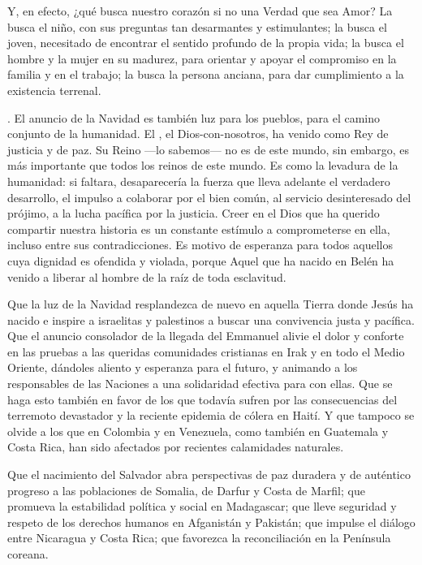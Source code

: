 Y, en efecto, ¿qué busca nuestro corazón si no una Verdad que sea Amor? La busca el niño, con sus preguntas tan desarmantes y estimulantes; la busca el joven, necesitado de encontrar el sentido profundo de la propia vida; la busca el hombre y la mujer en su madurez, para orientar y apoyar el compromiso en la familia y en el trabajo; la busca la persona anciana, para dar cumplimiento a la existencia terrenal.

. El anuncio de la Navidad es también luz para los pueblos, para el camino conjunto de la humanidad. El , el Dios-con-nosotros, ha venido como Rey de justicia y de paz. Su Reino ---lo sabemos--- no es de este mundo, sin embargo, es más importante que todos los reinos de este mundo. Es como la levadura de la humanidad: si faltara, desaparecería la fuerza que lleva adelante el verdadero desarrollo, el impulso a colaborar por el bien común, al servicio desinteresado del prójimo, a la lucha pacífica por la justicia. Creer en el Dios que ha querido compartir nuestra historia es un constante estímulo a comprometerse en ella, incluso entre sus contradicciones. Es motivo de esperanza para todos aquellos cuya dignidad es ofendida y violada, porque Aquel que ha nacido en Belén ha venido a liberar al hombre de la raíz de toda esclavitud.

Que la luz de la Navidad resplandezca de nuevo en aquella Tierra donde Jesús ha nacido e inspire a israelitas y palestinos a buscar una convivencia justa y pacífica. Que el anuncio consolador de la llegada del Emmanuel alivie el dolor y conforte en las pruebas a las queridas comunidades cristianas en Irak y en todo el Medio Oriente, dándoles aliento y esperanza para el futuro, y animando a los responsables de las Naciones a una solidaridad efectiva para con ellas. Que se haga esto también en favor de los que todavía sufren por las consecuencias del terremoto devastador y la reciente epidemia de cólera en Haití. Y que tampoco se olvide a los que en Colombia y en Venezuela, como también en Guatemala y Costa Rica, han sido afectados por recientes calamidades naturales.

Que el nacimiento del Salvador abra perspectivas de paz duradera y de auténtico progreso a las poblaciones de Somalia, de Darfur y Costa de Marfil; que promueva la estabilidad política y social en Madagascar; que lleve seguridad y respeto de los derechos humanos en Afganistán y Pakistán; que impulse el diálogo entre Nicaragua y Costa Rica; que favorezca la reconciliación en la Península coreana.

